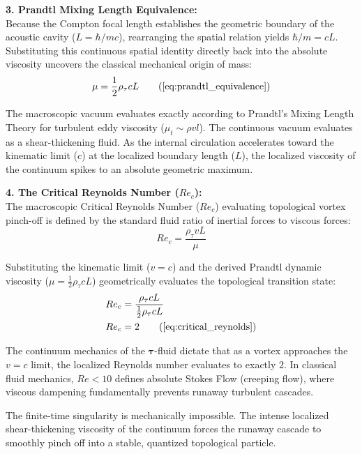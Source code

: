 \documentclass[11pt, a4paper]{article}
\begin{document}
\textbf{3. Prandtl Mixing Length Equivalence:} \\
Because the Compton focal length establishes the geometric boundary of the acoustic cavity ($L = \hbar/mc$), rearranging the spatial relation yields $\hbar/m = cL$. Substituting this continuous spatial identity directly back into the absolute viscosity uncovers the classical mechanical origin of mass:
\begin{equation}
    \mu = \frac{1}{2} \rho_{\tau} c L \tag{\ref{eq:prandtl_equivalence}}
\end{equation}

The macroscopic vacuum evaluates exactly according to Prandtl’s Mixing Length Theory for turbulent eddy viscosity ($\mu_t \sim \rho v l$). The continuous vacuum evaluates as a shear-thickening fluid. As the internal circulation accelerates toward the kinematic limit ($c$) at the localized boundary length ($L$), the localized viscosity of the continuum spikes to an absolute geometric maximum.

\textbf{4. The Critical Reynolds Number ($Re_c$):} \\
The macroscopic Critical Reynolds Number ($Re_c$) evaluating topological vortex pinch-off is defined by the standard fluid ratio of inertial forces to viscous forces:
\begin{equation}
    Re_c = \frac{\rho_{\tau} v L}{\mu} 
\end{equation}

Substituting the kinematic limit ($v=c$) and the derived Prandtl dynamic viscosity ($\mu = \frac{1}{2} \rho_{\tau} c L$) geometrically evaluates the topological transition state:
\begin{align}
    Re_c &= \frac{\rho_{\tau} c L}{\frac{1}{2} \rho_{\tau} c L}  \\
    Re_c &= 2 \tag{\ref{eq:critical_reynolds}}
\end{align}

The continuum mechanics of the $\boldsymbol{\tau}$-fluid dictate that as a vortex approaches the $v=c$ limit, the localized Reynolds number evaluates to exactly $2$. In classical fluid mechanics, $Re < 10$ defines absolute Stokes Flow (creeping flow), where viscous dampening fundamentally prevents runaway turbulent cascades. 

The finite-time singularity is mechanically impossible. The intense localized shear-thickening viscosity of the continuum forces the runaway cascade to smoothly pinch off into a stable, quantized topological particle.
\end{document}

